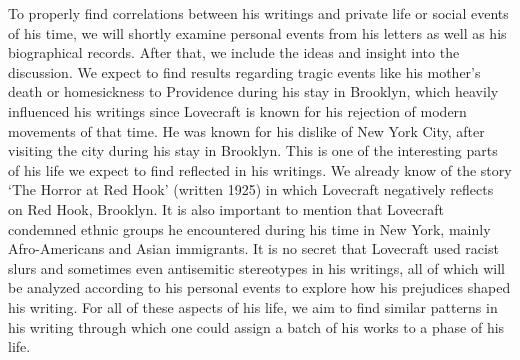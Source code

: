 To properly find correlations between his writings and private life or social events of his time, 
we will shortly examine personal events from his letters as well as his biographical records. After 
that, we include the ideas and insight into the discussion. We expect to find results regarding 
tragic events like his mother’s death or homesickness to Providence during his stay in Brooklyn, 
which heavily influenced his writings since Lovecraft is known for his rejection of modern 
movements of that time. He was known for his dislike of New York City, after visiting the city 
during his stay in Brooklyn. This is one of the interesting parts of his life we expect to find 
reflected in his writings. We already know of the story ‘The Horror at Red Hook’ (written 1925) 
in which Lovecraft negatively reflects on Red Hook, Brooklyn. It is also important to mention 
that Lovecraft condemned ethnic groups he encountered during his time in New York, mainly 
Afro-Americans and Asian immigrants. It is no secret that Lovecraft used racist slurs and sometimes 
even antisemitic stereotypes in his writings, all of which will be analyzed according to his 
personal events to explore how his prejudices shaped his writing. For all of these aspects of his 
life, we aim to find similar patterns in his writing through which one could assign a batch of 
his works to a phase of his life.